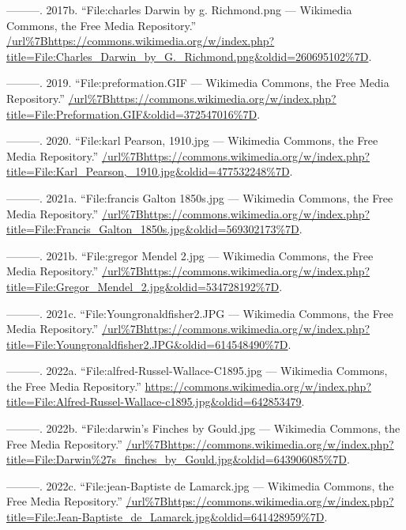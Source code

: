 \documentclass[
]{book}
\newlength{\cslhangindent}
\newlength{\cslentryspacingunit} %
\newenvironment{CSLReferences}[2] %
 {%
  \setlength{\parindent}{0pt}
  \ifodd #1
  \let\oldpar\par
  \def\par{\hangindent=\cslhangindent\oldpar}
  \fi
  \setlength{\parskip}{#2\cslentryspacingunit}
 }%
 {}
\begin{document}
\begin{CSLReferences}{1}{0}
\leavevmode{}%
---------. 2017b. {``File:charles Darwin by g. Richmond.png --- Wikimedia Commons{,} the Free Media Repository.''} \url{/url\%7Bhttps://commons.wikimedia.org/w/index.php?title=File:Charles_Darwin_by_G._Richmond.png\&oldid=260695102\%7D}.

\leavevmode{}%
---------. 2019. {``File:preformation.GIF --- Wikimedia Commons{,} the Free Media Repository.''} \url{/url\%7Bhttps://commons.wikimedia.org/w/index.php?title=File:Preformation.GIF\&oldid=372547016\%7D}.

\leavevmode{}%
---------. 2020. {``File:karl Pearson, 1910.jpg --- Wikimedia Commons{,} the Free Media Repository.''} \url{/url\%7Bhttps://commons.wikimedia.org/w/index.php?title=File:Karl_Pearson,_1910.jpg\&oldid=477532248\%7D}.

\leavevmode{}%
---------. 2021a. {``File:francis Galton 1850s.jpg --- Wikimedia Commons{,} the Free Media Repository.''} \url{/url\%7Bhttps://commons.wikimedia.org/w/index.php?title=File:Francis_Galton_1850s.jpg\&oldid=569302173\%7D}.

\leavevmode{}%
---------. 2021b. {``File:gregor Mendel 2.jpg --- Wikimedia Commons{,} the Free Media Repository.''} \url{/url\%7Bhttps://commons.wikimedia.org/w/index.php?title=File:Gregor_Mendel_2.jpg\&oldid=534728192\%7D}.

\leavevmode{}%
---------. 2021c. {``File:Youngronaldfisher2.JPG --- Wikimedia Commons{,} the Free Media Repository.''} \url{/url\%7Bhttps://commons.wikimedia.org/w/index.php?title=File:Youngronaldfisher2.JPG\&oldid=614548490\%7D}.

\leavevmode{}%
---------. 2022a. {``File:alfred-Russel-Wallace-C1895.jpg --- Wikimedia Commons{,} the Free Media Repository.''} \url{https://commons.wikimedia.org/w/index.php?title=File:Alfred-Russel-Wallace-c1895.jpg\&oldid=642853479}.

\leavevmode{}%
---------. 2022b. {``File:darwin's Finches by Gould.jpg --- Wikimedia Commons{,} the Free Media Repository.''} \url{/url\%7Bhttps://commons.wikimedia.org/w/index.php?title=File:Darwin\%27s_finches_by_Gould.jpg\&oldid=643906085\%7D}.

\leavevmode{}%
---------. 2022c. {``File:jean-Baptiste de Lamarck.jpg --- Wikimedia Commons{,} the Free Media Repository.''} \url{/url\%7Bhttps://commons.wikimedia.org/w/index.php?title=File:Jean-Baptiste_de_Lamarck.jpg\&oldid=641428959\%7D}.


\end{CSLReferences}
\end{document}
